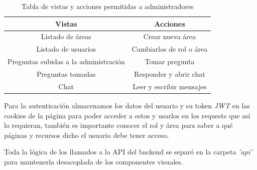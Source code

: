 	\begin{table}[h]
	\begin{center}
		\begin{tabular}{| c | c |}
			\hline
			Vistas & Acciones \\ \hline
			Listado de áreas & Crear nueva área \\ \hline 
			Listado de usuarios & Cambiarlos de rol o área  \\ \hline 
			Preguntas subidas a la administración & Tomar pregunta \\ \hline 
			Preguntas tomadas & Responder y abrir chat  \\ \hline 
			Chat & Leer y escribir mensajes  \\ \hline 
		\end{tabular}
		\caption{Tabla de vistas y acciones permitidas a administradores}
		\label{table:admin_views}
		
	\end{center}
\end{table}

Para la autenticación almacenamos los datos del usuario y su token \textit{JWT} en las cookies de la página para poder acceder a estos y usarlos en los requests que así lo requieran, también es importante conocer el rol y área para saber a qué páginas y recursos dicho el usuario debe tener acceso.
\newline

Toda la lógica de los llamados a la API del backend se separó en la carpeta \textit{'api'} para mantenerla desacoplada de los componentes visuales.

